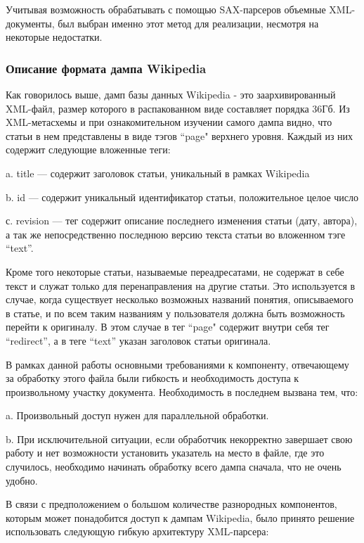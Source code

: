 Учитывая возможность обрабатывать с помощью SAX-парсеров объемные XML-документы, 
был выбран именно этот метод для реализации, несмотря на некоторые недостатки.

\subsubsection{Описание формата дампа Wikipedia}
Как говорилось выше, дамп базы данных Wikipedia \cite{dump} - это заархивированный XML-файл, размер которого 
в распакованном виде составляет порядка 36Гб. Из XML-метасхемы \cite{schema} 
и при ознакомительном изучении самого дампа видно, что статьи в нем представлены в виде 
тэгов ``page" верхнего уровня. Каждый из них содержит следующие вложенные теги:

a. title --- содержит заголовок статьи, уникальный в рамках Wikipedia

b. id --- содержит уникальный идентификатор статьи, положительное целое число

с. revision --- тег содержит описание последнего изменения статьи (дату, автора), 
а так же непосредственно последнюю версию текста статьи во вложенном тэге ``text''. 

Кроме того некоторые статьи, называемые переадресатами, не содержат в себе текст 
и служат только для перенаправления на другие статьи. 
Это используется в случае, когда существует несколько возможных названий понятия, 
описываемого в статье, и по всем таким названиям у пользователя должна быть возможность перейти к оригиналу.
В этом случае в тег ``page" содержит внутри себя тег ``redirect'', 
а в теге ``text'' указан заголовок статьи оригинала.


В рамках данной работы основными требованиями к компоненту, отвечающему 
за обработку этого файла были гибкость и необходимость доступа к произвольному участку документа.
Необходимость в последнем вызвана тем, что:

a. Произвольный доступ нужен для параллельной обработки.

b. При исключительной ситуации, если обработчик некорректно завершает свою работу и 
нет возможности установить указатель на место в файле, где это случилось,
необходимо начинать обработку всего дампа сначала, что не очень удобно.

В связи с предположением о большом количестве разнородных компонентов,
которым может понадобится доступ к дампам Wikipedia, было принято решение 
использовать следующую гибкую архитектуру XML-парсера:

